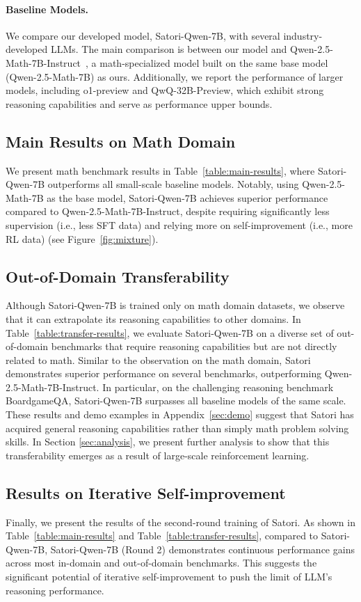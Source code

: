 \paragraph{Baseline Models.}
We compare our developed model, Satori-Qwen-7B, with several industry-developed LLMs. The main comparison is between our model and Qwen-2.5-Math-7B-Instruct~\cite{qwen2_5}, a math-specialized model built on the same base model (Qwen-2.5-Math-7B) as ours. Additionally, we report the performance of larger models, including o1-preview and QwQ-32B-Preview, which exhibit strong reasoning capabilities and serve as performance upper bounds.



\subsection{Main Results on Math Domain} \label{subsec:main_results}
We present math benchmark results in Table~\ref{table:main-results}, where Satori-Qwen-7B outperforms all small-scale baseline models. Notably, using Qwen-2.5-Math-7B as the base model, Satori-Qwen-7B achieves superior performance compared to Qwen-2.5-Math-7B-Instruct, despite requiring significantly less supervision (i.e., less SFT data) and relying more on self-improvement (i.e., more RL data) (see Figure~\ref{fig:mixture}). 

\subsection{Out-of-Domain Transferability} \label{subsec:transfer_results}
Although Satori-Qwen-7B is trained only on math domain datasets, we observe that it can extrapolate its reasoning capabilities to other domains. In Table~\ref{table:transfer-results}, we evaluate Satori-Qwen-7B on a diverse set of out-of-domain benchmarks that require reasoning capabilities but are not directly related to math. Similar to the observation on the math domain, Satori demonstrates superior performance on several benchmarks, outperforming Qwen-2.5-Math-7B-Instruct. In particular, on the challenging reasoning benchmark BoardgameQA, Satori-Qwen-7B surpasses all baseline models of the same scale. These results and demo examples in Appendix~\ref{sec:demo} suggest that Satori has acquired general reasoning capabilities rather than simply math problem solving skills. In Section \ref{sec:analysis}, we present further analysis to show that this transferability emerges as a result of large-scale reinforcement learning.

\subsection{Results on Iterative Self-improvement}
Finally, we present the results of the second-round training of Satori. As shown in Table~\ref{table:main-results} and Table~\ref{table:transfer-results}, compared to Satori-Qwen-7B, Satori-Qwen-7B (Round 2) demonstrates continuous performance gains across most in-domain and out-of-domain benchmarks. This suggests the significant potential of iterative self-improvement to push the limit of LLM's reasoning performance.

